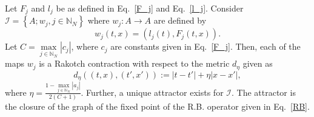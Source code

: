 \documentclass[sn-mathphys-num]{sn-jnl}
\numberwithin{equation}{section}
\begin{document}
\begin{theorem}\label{graphoffp}
Let $F_j$ and $l_j$ be as defined in Eq.~\eqref{F_j} and Eq.~\eqref{l_j}. Consider~
\\$\mathcal{I}=\left\{ A; w_j, j\in\mathbb N_N\right\}$ where  $w_j: A\rightarrow A $ are defined by 
\begin{equation}
w_j(t,x)=(l_j(t),F_j(t,x)).             \label{wi}
\end{equation}
Let $C=\max\limits_{j\in\mathbb N_N}|c_j|$, where $c_j$ are constants given in Eq.~\eqref{F_j}. Then, each of the maps $w_j$ is a Rakotch contraction with respect to the metric $d_{\eta}$ given as
\begin{equation*}
d_{\eta}((t,x),(t',x')):=|t-t'|+\eta|x-x'|,
\end{equation*}
where $\eta=\frac{1-\max\limits_{j\in \mathbb N_N}|a_j|}{2(C+1)}$.
Further, a unique attractor exists for $\mathcal{I}$. The attractor is the closure of the graph of the fixed point of the R.B. operator given in Eq.~\eqref{RB}.
\end{theorem}
\end{document}
